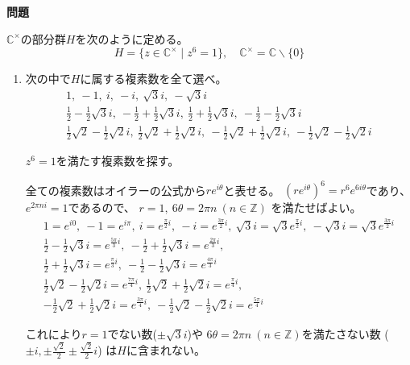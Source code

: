 \documentclass[12pt,b5paper]{ltjsarticle}
\begin{document}
\hrulefill
\textbf{問題}
\hrulefill



$\mathbb{C}^{\times}$の部分群$H$を次のように定める。
\begin{equation}
 H=\{z\in\mathbb{C}^{\times} \mid z^{6}=1\}
  ,\quad
  \mathbb{C}^{\times}=\mathbb{C}\backslash \{0\}
\end{equation}
\begin{enumerate}
 \item
      次の中で$H$に属する複素数を全て選べ。
      \begin{gather}
        1,\ -1,\
        i,\ -i,\
        \sqrt{3}i,\ -\sqrt{3}i\\
        \frac{1}{2}-\frac{1}{2}\sqrt{3}i,\
        -\frac{1}{2}+\frac{1}{2}\sqrt{3}i,\
        \frac{1}{2}+\frac{1}{2}\sqrt{3}i,\
        -\frac{1}{2}-\frac{1}{2}\sqrt{3}i\\
        \frac{1}{2}\sqrt{2}-\frac{1}{2}\sqrt{2}i,\
        \frac{1}{2}\sqrt{2}+\frac{1}{2}\sqrt{2}i,\
        -\frac{1}{2}\sqrt{2}+\frac{1}{2}\sqrt{2}i,\
        -\frac{1}{2}\sqrt{2}-\frac{1}{2}\sqrt{2}i
      \end{gather}
\dotfill

      $z^6=1$を満たす複素数を探す。
      
      全ての複素数はオイラーの公式から$re^{i\theta}$と表せる。
      $(re^{i\theta})^6=r^{6}e^{6i\theta}$であり、
      $e^{2\pi n i}=1$であるので、
      $r= 1,\ 6\theta = 2\pi n \ (n\in\mathbb{Z})$
      を満たせばよい。
      \begin{gather}
        1=e^{i0},\ -1=e^{i\pi},\
        i=e^{\frac{\pi}{2}i},\ -i=e^{\frac{3\pi}{2}i},\
        \sqrt{3}i=\sqrt{3}e^{\frac{\pi}{2}i},\ -\sqrt{3}i=\sqrt{3}e^{\frac{3\pi}{2}i}\\
        \frac{1}{2}-\frac{1}{2}\sqrt{3}i=e^{\frac{5\pi}{3}i},\
        -\frac{1}{2}+\frac{1}{2}\sqrt{3}i=e^{\frac{2\pi}{3}i},\\
        \frac{1}{2}+\frac{1}{2}\sqrt{3}i=e^{\frac{\pi}{3}i},\
        -\frac{1}{2}-\frac{1}{2}\sqrt{3}i=e^{\frac{4\pi}{3}i}\\
        \frac{1}{2}\sqrt{2}-\frac{1}{2}\sqrt{2}i=e^{\frac{7\pi}{4}i},\
        \frac{1}{2}\sqrt{2}+\frac{1}{2}\sqrt{2}i=e^{\frac{\pi}{4}i},\\
        -\frac{1}{2}\sqrt{2}+\frac{1}{2}\sqrt{2}i=e^{\frac{3\pi}{4}i},\
        -\frac{1}{2}\sqrt{2}-\frac{1}{2}\sqrt{2}i=e^{\frac{5\pi}{4}i}
      \end{gather}

      これにより$r=1$でない数($\pm\sqrt{3}i$)や
      $6\theta = 2\pi n \ (n\in\mathbb{Z})$を満たさない数
      ($\pm i, \pm\frac{\sqrt{2}}{2}\pm\frac{\sqrt{2}}{2}i$)
      は$H$に含まれない。


\end{enumerate}
\end{document}
